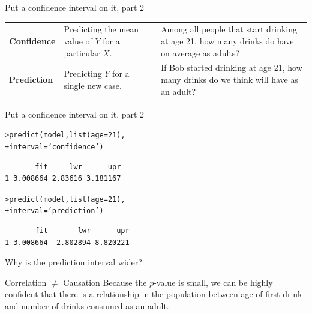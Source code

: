 \documentclass{beamer}\usepackage[]{graphicx}\usepackage[]{color}
\makeatletter
\newcommand{\hlnum}[1]{\textcolor[rgb]{0.824,0.412,0.118}{#1}}%
\newcommand{\hlstr}[1]{\textcolor[rgb]{1,0.894,0.71}{#1}}%
\newcommand{\hlstd}[1]{\textcolor[rgb]{1,0.894,0.769}{#1}}%
\newcommand{\hlkwc}[1]{\textcolor[rgb]{0.78,0.941,0.545}{#1}}%
\newcommand{\hlkwd}[1]{\textcolor[rgb]{1,0.78,0.769}{#1}}%
\newenvironment{kframe}{%
 \def\at@end@of@kframe{}%
 \ifinner\ifhmode%
  \def\at@end@of@kframe{\end{minipage}}%
  \begin{minipage}{\columnwidth}%
 \fi\fi%
 \def\FrameCommand##1{\hskip\@totalleftmargin \hskip-\fboxsep
 \colorbox{shadecolor}{##1}\hskip-\fboxsep
     \hskip-\linewidth \hskip-\@totalleftmargin \hskip\columnwidth}%
 \MakeFramed {\advance\hsize-\width
   \@totalleftmargin\z@ \linewidth\hsize
   \@setminipage}}%
 {\par\unskip\endMakeFramed%
 \at@end@of@kframe}
\newenvironment{knitrout}{}{} %
\makeatother
\begin{document}
\begin{darkframes}
\begin{frame}{Put a confidence interval on it, part 2}
      \begin{tabular}{lp{1in}p{2in}}
        \textbf{Confidence} & Predicting the mean value of $Y$ for a particular $X$. & Among all people that start drinking at age 21, how many drinks do have on average as adults? \\
        \textbf{Prediction} & Predicting $Y$ for a single new case. & If Bob started drinking at age 21, how many drinks do we think will have as an adult? \\
      \end{tabular}
    \end{frame}

    \begin{frame}[fragile]{Put a confidence interval on it, part 2}

\begin{knitrout}
\begin{kframe}
\begin{alltt}
\hlstd{> }\hlkwd{predict}\hlstd{(model,} \hlkwd{list}\hlstd{(}\hlkwc{age}\hlstd{=}\hlnum{21}\hlstd{),}
\hlstd{+ }  \hlkwc{interval}\hlstd{=}\hlstr{'confidence'}\hlstd{)}
\end{alltt}
\begin{verbatim}
       fit     lwr      upr
1 3.008664 2.83616 3.181167
\end{verbatim}
\begin{alltt}
\hlstd{> }\hlkwd{predict}\hlstd{(model,} \hlkwd{list}\hlstd{(}\hlkwc{age}\hlstd{=}\hlnum{21}\hlstd{),}
\hlstd{+ }  \hlkwc{interval}\hlstd{=}\hlstr{'prediction'}\hlstd{)}
\end{alltt}
\begin{verbatim}
       fit       lwr      upr
1 3.008664 -2.802894 8.820221
\end{verbatim}
\end{kframe}
\end{knitrout}

      \pause
      Why is the prediction interval wider?
      \lc
    \end{frame}

    \begin{frame}
    \end{frame}

    \begin{frame}{Correlation $\neq$ Causation}
      Because the $p$-value is small, we can be highly confident that there is a relationship in
      the population between age of first drink and number of drinks consumed as an adult.


\end{frame}
\end{darkframes}
\end{document}
